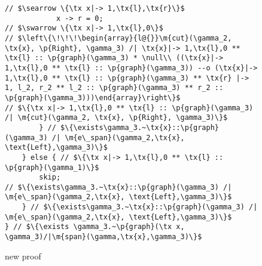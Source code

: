 \documentclass{article}
\newcommand{\tx}[1]{\text{#1}}
\newcommand{\p}[1]{\ensuremath{\mathsf{#1}}} %
\newcommand{\m}[1]{\ensuremath{\mathit{#1}}} %
\begin{document}
\begin{figure}[htbp]
\begin{lstlisting}
// $\searrow \{\tx x|-> 1,\tx{l},\tx{r}\}$
            x -> r = 0;
// $\swarrow \{\tx x|-> 1,\tx{l},0\}$
// $\left\{\!\!\!\begin{array}{l@{}}\m{cut}(\gamma_2, \tx{x}, \p{Right}, \gamma_3) /| \tx{x}|-> 1,\tx{l},0 ** \tx{l} :: \p{graph}(\gamma_3) * \null\\ ((\tx{x}|-> 1,\tx{l},0 ** \tx{l} :: \p{graph}(\gamma_3)) --o (\tx{x}|-> 1,\tx{l},0 ** \tx{l} :: \p{graph}(\gamma_3) ** \tx{r} |-> 1, l_2, r_2 ** l_2 :: \p{graph}(\gamma_3) ** r_2 :: \p{graph}(\gamma_3)))\end{array}\right\}$
// $\{\tx x|-> 1,\tx{l},0 ** \tx{l} :: \p{graph}(\gamma_3) /| \m{cut}(\gamma_2, \tx{x}, \p{Right}, \gamma_3)\}$
        } // $\{\exists\gamma_3.~\tx{x}::\p{graph}(\gamma_3) /| \m{e\_span}(\gamma_2,\tx{x}, \text{Left},\gamma_3)\}$
    } else { // $\{\tx x|-> 1,\tx{l},0 ** \tx{l} :: \p{graph}(\gamma_1)\}$
        skip;
// $\{\exists\gamma_3.~\tx{x}::\p{graph}(\gamma_3) /| \m{e\_span}(\gamma_2,\tx{x}, \text{Left},\gamma_3)\}$
    } // $\{\exists\gamma_3.~\tx{x}::\p{graph}(\gamma_3) /| \m{e\_span}(\gamma_2,\tx{x}, \text{Left},\gamma_3)\}$
} // $\{\exists \gamma_3.~\p{graph}(\tx x, \gamma_3)/|\m{span}(\gamma,\tx{x},\gamma_3)\}$
\end{lstlisting}
\caption{new proof}
\end{figure}
\end{document}
